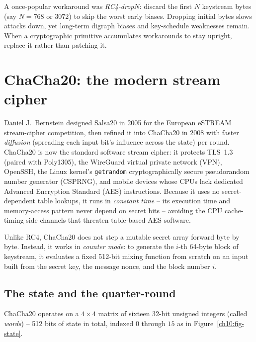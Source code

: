 \begin{trapbox}
A once-popular workaround was \emph{RC4-drop$N$}: discard the first $N$ keystream bytes (say $N = 768$ or $3072$) to skip the worst early biases. Dropping initial bytes slows attacks down, yet long-term digraph biases and key-schedule weaknesses remain. When a cryptographic primitive accumulates workarounds to stay upright, replace it rather than patching it.
\end{trapbox}

\section{ChaCha20: the modern stream cipher}
\label{ch10:chacha}

\begin{applicationbox}
Daniel J.\ Bernstein designed Salsa20 in 2005 for the European eSTREAM stream-cipher competition, then refined it into ChaCha20 in 2008 with faster \emph{diffusion} (spreading each input bit's influence across the state) per round. ChaCha20 is now the standard software stream cipher: it protects TLS~1.3 (paired with Poly1305), the WireGuard virtual private network (VPN), OpenSSH, the Linux kernel's \texttt{getrandom} cryptographically secure pseudorandom number generator (CSPRNG), and mobile devices whose CPUs lack dedicated Advanced Encryption Standard (AES) instructions. Because it uses no secret-dependent table lookups, it runs in \emph{constant time} -- its execution time and memory-access pattern never depend on secret bits -- avoiding the CPU cache-timing side channels that threaten table-based AES software.
\end{applicationbox}

Unlike RC4, ChaCha20 does not step a mutable secret array forward byte by byte. Instead, it works in \emph{counter mode}: to generate the $i$-th 64-byte block of keystream, it evaluates a fixed 512-bit mixing function from scratch on an input built from the secret key, the message nonce, and the block number $i$.

\subsection{The state and the quarter-round}
\label{ch10:chacha-state}

ChaCha20 operates on a $4\times4$ matrix of sixteen 32-bit unsigned integers (called \emph{words}) -- 512 bits of state in total, indexed $0$ through $15$ as in Figure~\ref{ch10:fig-state}.

